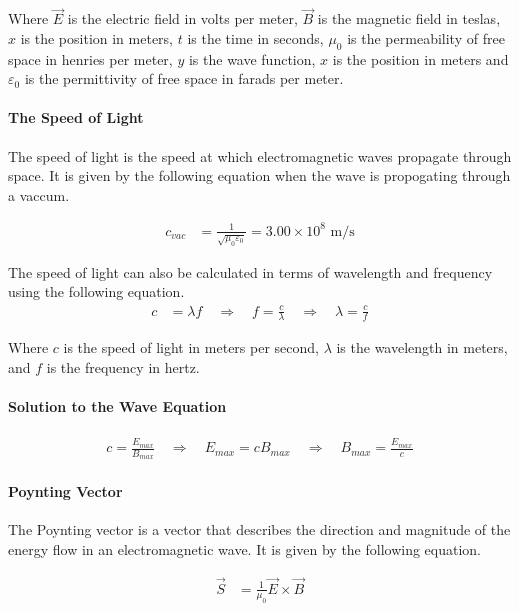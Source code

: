 Where $\vec{E}$ is the electric field in volts per meter, $\vec{B}$ is the magnetic field in teslas, $x$ is the position in meters, $t$ is the time 
in seconds, $\mu_0$ is the permeability of free space in henries per meter, $y$ is the wave function, $x$ is the position in meters and $\varepsilon_0$ 
is the permittivity of free space in farads per meter.\\

\paragraph{The Speed of Light}
The speed of light is the speed at which electromagnetic waves propagate through space. It is given by the following equation when the wave is propogating
through a vaccum.

\begin{align*}
    c_{vac} &= \frac{1}{\sqrt{\mu_0\varepsilon_0}} = 3.00 \times 10^8 \text{ m/s}
\end{align*}

The speed of light can also be calculated in terms of wavelength and frequency using the following equation.
\begin{align*}
    c &= \lambda f \quad \Rightarrow \quad f = \frac{c}{\lambda} \quad \Rightarrow \quad \lambda = \frac{c}{f}
\end{align*}

Where $c$ is the speed of light in meters per second, $\lambda$ is the wavelength in meters, and $f$ is the frequency in hertz.\\

\paragraph*{Solution to the Wave Equation}

\begin{align*}
    c = \frac{E_{max}}{B_{max}} \quad \Rightarrow \quad E_{max} = cB_{max} \quad \Rightarrow \quad B_{max} = \frac{E_{max}}{c}
\end{align*}

\paragraph{Poynting Vector}
The Poynting vector is a vector that describes the direction and magnitude of the energy flow in an electromagnetic wave. It is given by the following equation.

\begin{align*}
    \vec{S} &= \frac{1}{\mu_0}\vec{E} \times \vec{B}
\end{align*}

